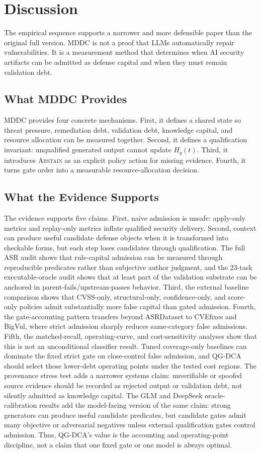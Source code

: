 ﻿\documentclass[lettersize,journal]{IEEEtran}
\begin{document}
\section{Discussion}
The empirical sequence supports a narrower and more defensible paper than the original full version. MDDC is not a proof that LLMs automatically repair vulnerabilities. It is a measurement method that determines when AI security artifacts can be admitted as defense capital and when they must remain validation debt.

\subsection{What MDDC Provides}
MDDC provides four concrete mechanisms. First, it defines a shared state so threat pressure, remediation debt, validation debt, knowledge capital, and resource allocation can be measured together. Second, it defines a qualification invariant: unqualified generated output cannot update $H_q(t)$. Third, it introduces \textsc{Abstain} as an explicit policy action for missing evidence. Fourth, it turns gate order into a measurable resource-allocation decision.

\subsection{What the Evidence Supports}
The evidence supports five claims. First, naive admission is unsafe: apply-only metrics and replay-only metrics inflate qualified security delivery. Second, context can produce useful candidate defense objects when it is transformed into checkable forms, but each step loses candidates through qualification. The full ASR audit shows that rule-capital admission can be measured through reproducible predicates rather than subjective author judgment, and the 23-task executable-oracle audit shows that at least part of the validation substrate can be anchored in parent-fails/upstream-passes behavior. Third, the external baseline comparison shows that CVSS-only, structural-only, confidence-only, and score-only policies admit substantially more false capital than gated admission. Fourth, the gate-accounting pattern transfers beyond ASRDataset to CVEfixes and BigVul, where strict admission sharply reduces same-category false admissions. Fifth, the matched-recall, operating-curve, and cost-sensitivity analyses show that this is not an unconditional classifier result. Tuned coverage-only baselines can dominate the fixed strict gate on close-control false admission, and QG-DCA should select those lower-debt operating points under the tested cost regions. The provenance stress test adds a narrower systems claim: unverifiable or spoofed source evidence should be recorded as rejected output or validation debt, not silently admitted as knowledge capital. The GLM and DeepSeek oracle-calibration results add the model-facing version of the same claim: strong generators can produce useful candidate predicates, but candidate gates admit many objective or adversarial negatives unless external qualification gates control admission. Thus, QG-DCA's value is the accounting and operating-point discipline, not a claim that one fixed gate or one model is always optimal.
\end{document}
